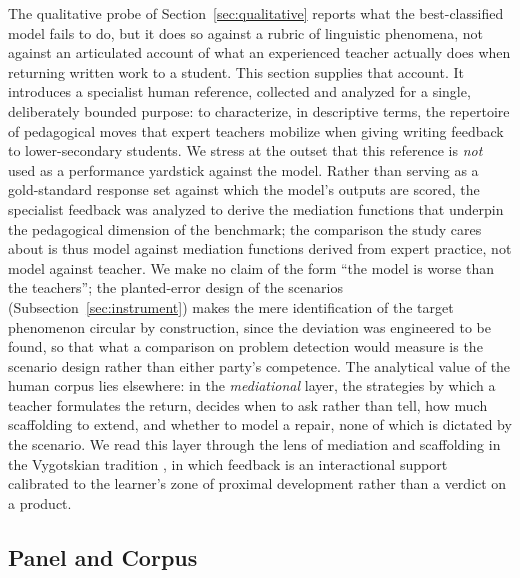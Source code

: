 \documentclass{sbc2023}%
\begin{document}
The qualitative probe of Section~\ref{sec:qualitative} reports what the best-classified model fails to do, but it does so against a rubric of linguistic phenomena, not against an articulated account of what an experienced teacher actually does when returning written work to a student. This section supplies that account. It introduces a specialist human reference, collected and analyzed for a single, deliberately bounded purpose: to characterize, in descriptive terms, the repertoire of pedagogical moves that expert teachers mobilize when giving writing feedback to lower-secondary students. We stress at the outset that this reference is \textit{not} used as a performance yardstick against the model. Rather than serving as a gold-standard response set against which the model's outputs are scored, the specialist feedback was analyzed to derive the mediation functions that underpin the pedagogical dimension of the benchmark; the comparison the study cares about is thus model against mediation functions derived from expert practice, not model against teacher. We make no claim of the form ``the model is worse than the teachers''; the planted-error design of the scenarios (Subsection~\ref{sec:instrument}) makes the mere identification of the target phenomenon circular by construction, since the deviation was engineered to be found, so that what a comparison on problem detection would measure is the scenario design rather than either party's competence. The analytical value of the human corpus lies elsewhere: in the \textit{mediational} layer, the strategies by which a teacher formulates the return, decides when to ask rather than tell, how much scaffolding to extend, and whether to model a repair, none of which is dictated by the scenario. We read this layer through the lens of mediation and scaffolding in the Vygotskian tradition \citep{vygotsky1978mind,wood1976scaffolding}, in which feedback is an interactional support calibrated to the learner's zone of proximal development rather than a verdict on a product.

\subsection{Panel and Corpus}
\end{document}
